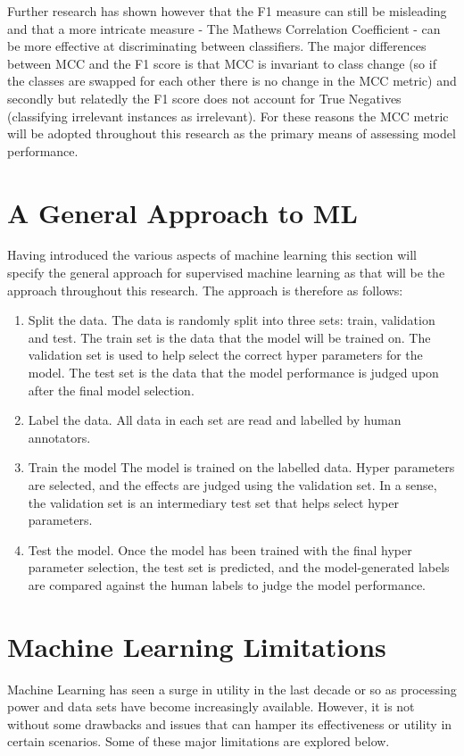 Further research \parencite{chicco2020advantages} has shown however that the F1 measure can still be misleading and that a more intricate measure - The Mathews Correlation Coefficient - can be more effective at discriminating between classifiers. The major differences between MCC and the F1 score is that MCC is invariant to class change (so if the classes are swapped for each other there is no change in the MCC metric) and secondly but relatedly the F1 score does not account for True Negatives (classifying irrelevant instances as irrelevant).  For these reasons the MCC metric will be adopted throughout this research as the primary means of assessing model performance. 
 

\section{A General Approach to ML} Having introduced the various aspects of machine learning this section will specify the general approach for supervised machine learning as that will be the approach throughout this research. The approach is therefore as follows:

\begin{enumerate}
\item{Split the data.} The data is randomly split into three sets: train, validation and test. The train set is the data that the model will be trained on. The validation set is used to help select the correct hyper parameters for the model. The test set is the data that the model performance is judged upon after the final model selection.
\item{Label the data.} All data in each set are read and labelled by human annotators.
\item{Train the model} The model is trained on the labelled data. Hyper parameters are selected, and the effects are judged using the validation set. In a sense, the validation set is an intermediary test set that helps select hyper parameters.
\item{Test the model.} Once the model has been trained with the final hyper parameter selection, the test set is predicted, and the model-generated labels are compared against the human labels to judge the model performance.
\end{enumerate}

\section{Machine Learning Limitations} Machine Learning has seen a surge in utility in the last decade or so as processing power and data sets have become increasingly available. However, it is not without some drawbacks and issues that can hamper its effectiveness or utility in certain scenarios. Some of these major limitations are explored below.

